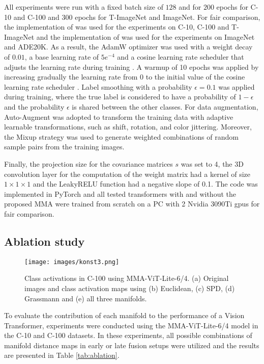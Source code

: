 \documentclass[10pt,twocolumn,letterpaper]{article}
\begin{document}
All experiments were run with a fixed batch size of $128$ and for $200$ epochs for C-10 and C-100 and $300$ epochs for T-ImageNet and ImageNet. For fair comparison, the implementation of \cite{Author1} was used for the experiments on C-10, C-100 and T-ImageNet and the implementation of \cite{Author57} was used for the experiments on ImageNet and ADE20K. As a result, the AdamW optimizer \cite{Author23} was used with a weight decay of $0.01$, a base learning rate of $5e^{-4}$ and a cosine learning rate scheduler that adjusts the learning rate during training \cite{Author24}. A warmup of 10 epochs was applied by increasing gradually the learning rate from 0 to the initial value of the cosine learning rate scheduler \cite{Author25}. Label smoothing \cite{Author22} with a probability $\epsilon=0.1$ was applied during training, where the true label is considered to have a probability of $1-\epsilon$ and the probability $\epsilon$ is shared between the other classes. For data augmentation, Auto-Augment \cite{Author26} was adopted to transform the training data with adaptive learnable transformations, such as shift, rotation, and color jittering. Moreover, the Mixup strategy \cite{Author27} was used to generate weighted combinations of random sample pairs from the training images.

Finally, the projection size for the covariance matrices $s$ was set to 4, the 3D convolution layer for the computation of the weight matrix had a kernel of size $1\times1\times1$ and the LeakyRELU function had a negative slope of 0.1. The code was implemented in PyTorch and all tested transformers with and without the proposed MMA were trained from scratch on a PC with 2 Nvidia 3090Ti gpus for fair comparison.

\subsection{Ablation study}
\label{sec:ablation}

\begin{figure}[t]
  \centering
  \texttt{[image: images/konst3.png]}
  \caption{Class activations in C-100 using MMA-ViT-Lite-6/4. (a) Original images and class activation maps using (b) Euclidean, (c) SPD, (d) Grassmann and (e) all three manifolds.}
  \label{fig:c100_vis}
\end{figure}

To evaluate the contribution of each manifold to the performance of a Vision Transformer, experiments were conducted using the MMA-ViT-Lite-6/4 model in the C-10 and C-100 datasets. In these experiments, all possible combinations of manifold distance maps in early or late fusion setups were utilized and the results are presented in Table \ref{tab:ablation}.
\end{document}
